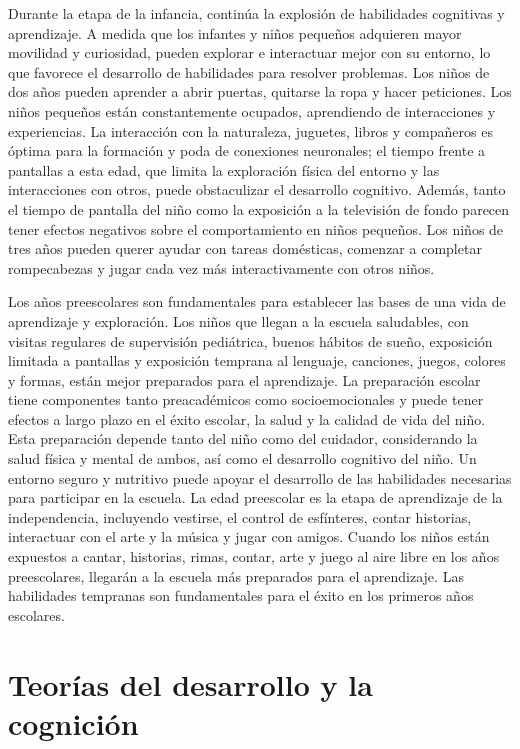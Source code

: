 \documentclass[11pt,letterpaper]{report}
\begin{document}
Durante la etapa de la infancia, continúa la explosión de habilidades
cognitivas y aprendizaje. A medida que los infantes y niños pequeños adquieren
mayor movilidad y curiosidad, pueden explorar e interactuar mejor con su
entorno, lo que favorece el desarrollo de habilidades para resolver problemas.
Los niños de dos años pueden aprender a abrir puertas, quitarse la ropa y hacer
peticiones. Los niños pequeños están constantemente ocupados, aprendiendo de
interacciones y experiencias. La interacción con la naturaleza, juguetes,
libros y compañeros es óptima para la formación y poda de conexiones
neuronales; el tiempo frente a pantallas a esta edad, que limita la exploración
física del entorno y las interacciones con otros, puede obstaculizar el
desarrollo cognitivo. Además, tanto el tiempo de pantalla del niño como la
exposición a la televisión de fondo parecen tener efectos negativos sobre el
comportamiento en niños pequeños. Los niños de tres años pueden querer ayudar
con tareas domésticas, comenzar a completar rompecabezas y jugar cada vez más
interactivamente con otros niños. \cite{Crotty2023}

Los años preescolares son fundamentales para establecer las bases de una vida
de aprendizaje y exploración. Los niños que llegan a la escuela saludables, con
visitas regulares de supervisión pediátrica, buenos hábitos de sueño,
exposición limitada a pantallas y exposición temprana al lenguaje, canciones,
juegos, colores y formas, están mejor preparados para el aprendizaje. La
preparación escolar tiene componentes tanto preacadémicos como
socioemocionales y puede tener efectos a largo plazo en el éxito escolar, la
salud y la calidad de vida del niño. Esta preparación depende tanto del niño
como del cuidador, considerando la salud física y mental de ambos, así como el
desarrollo cognitivo del niño. Un entorno seguro y nutritivo puede apoyar el
desarrollo de las habilidades necesarias para participar en la escuela. La edad
preescolar es la etapa de aprendizaje de la independencia, incluyendo vestirse,
el control de esfínteres, contar historias, interactuar con el arte y la música
y jugar con amigos. Cuando los niños están expuestos a cantar, historias,
rimas, contar, arte y juego al aire libre en los años preescolares, llegarán a
la escuela más preparados para el aprendizaje. Las habilidades tempranas son
fundamentales para el éxito en los primeros años escolares. \cite{Crotty2023}

\section{Teorías del desarrollo y la cognición}
\end{document}
